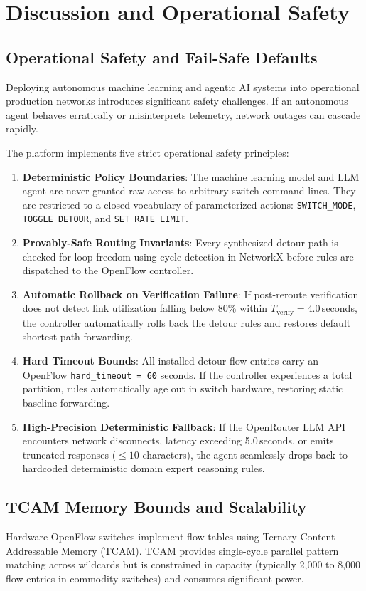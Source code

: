 \chapter{Discussion and Operational Safety}
\label{ch:discussion}

\section{Operational Safety and Fail-Safe Defaults}
Deploying autonomous machine learning and agentic AI systems into operational production networks introduces significant safety challenges. If an autonomous agent behaves erratically or misinterprets telemetry, network outages can cascade rapidly.

The platform implements five strict operational safety principles:
\begin{enumerate}
  \item \textbf{Deterministic Policy Boundaries}: The machine learning model and LLM agent are never granted raw access to arbitrary switch command lines. They are restricted to a closed vocabulary of parameterized actions: \texttt{SWITCH\_MODE}, \texttt{TOGGLE\_DETOUR}, and \texttt{SET\_RATE\_LIMIT}.
  \item \textbf{Provably-Safe Routing Invariants}: Every synthesized detour path is checked for loop-freedom using cycle detection in NetworkX before rules are dispatched to the OpenFlow controller.
  \item \textbf{Automatic Rollback on Verification Failure}: If post-reroute verification does not detect link utilization falling below 80\% within $T_{\text{verify}} = 4.0$\,seconds, the controller automatically rolls back the detour rules and restores default shortest-path forwarding.
  \item \textbf{Hard Timeout Bounds}: All installed detour flow entries carry an OpenFlow \texttt{hard\_timeout = 60} seconds. If the controller experiences a total partition, rules automatically age out in switch hardware, restoring static baseline forwarding.
  \item \textbf{High-Precision Deterministic Fallback}: If the OpenRouter LLM API encounters network disconnects, latency exceeding 5.0\,seconds, or emits truncated responses ($\le 10$ characters), the agent seamlessly drops back to hardcoded deterministic domain expert reasoning rules.
\end{enumerate}

\section{TCAM Memory Bounds and Scalability}
Hardware OpenFlow switches implement flow tables using Ternary Content-Addressable Memory (TCAM). TCAM provides single-cycle parallel pattern matching across wildcards but is constrained in capacity (typically 2,000 to 8,000 flow entries in commodity switches) and consumes significant power.

